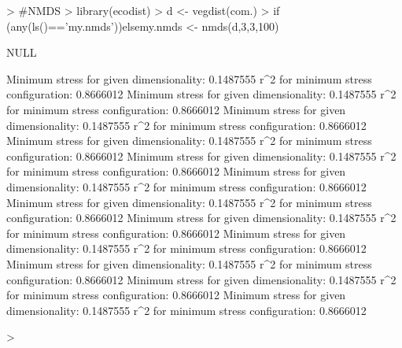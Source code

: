 \documentclass[12pt]{article}
\begin{document}
\begin{Schunk}
\begin{Sinput}
>                                         #NMDS
> library(ecodist)
> d <- vegdist(com.)
> if (any(ls()=='my.nmds')){}else{my.nmds <- nmds(d,3,3,100)}
\end{Sinput}
\begin{Soutput}
NULL
\end{Soutput}
\begin{Soutput}
Minimum stress for given dimensionality:  0.1487555 
r^2 for minimum stress configuration:  0.8666012 
Minimum stress for given dimensionality:  0.1487555 
r^2 for minimum stress configuration:  0.8666012 
Minimum stress for given dimensionality:  0.1487555 
r^2 for minimum stress configuration:  0.8666012 
Minimum stress for given dimensionality:  0.1487555 
r^2 for minimum stress configuration:  0.8666012 
Minimum stress for given dimensionality:  0.1487555 
r^2 for minimum stress configuration:  0.8666012 
Minimum stress for given dimensionality:  0.1487555 
r^2 for minimum stress configuration:  0.8666012 
Minimum stress for given dimensionality:  0.1487555 
r^2 for minimum stress configuration:  0.8666012 
Minimum stress for given dimensionality:  0.1487555 
r^2 for minimum stress configuration:  0.8666012 
Minimum stress for given dimensionality:  0.1487555 
r^2 for minimum stress configuration:  0.8666012 
Minimum stress for given dimensionality:  0.1487555 
r^2 for minimum stress configuration:  0.8666012 
Minimum stress for given dimensionality:  0.1487555 
r^2 for minimum stress configuration:  0.8666012 
Minimum stress for given dimensionality:  0.1487555 
r^2 for minimum stress configuration:  0.8666012 
\end{Soutput}
\begin{Sinput}
> 
\end{Sinput}
\end{Schunk}
\end{document}
